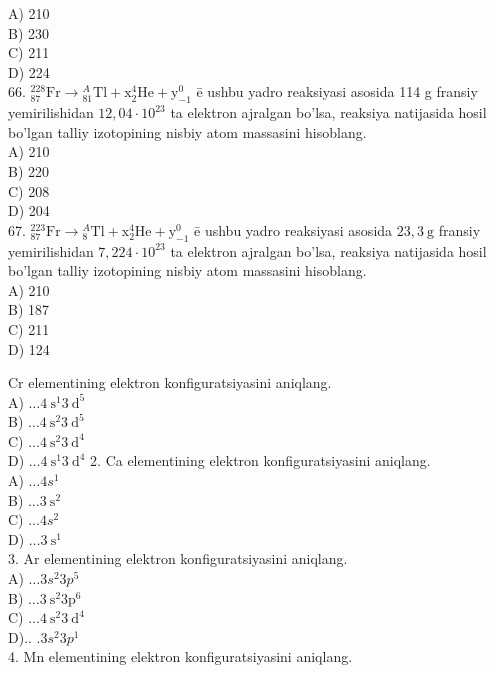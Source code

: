 A) 210\\
B) 230\\
C) 211\\
D) 224\\
66. ${ }_{87}^{228} \mathrm{Fr} \rightarrow{ }_{81}^{A} \mathrm{Tl}+\mathrm{x}_{2}^{4} \mathrm{He}+\mathrm{y}_{-1}^{0}$ ē ushbu yadro reaksiyasi asosida 114 g fransiy yemirilishidan $12,04 \cdot 10^{23}$ ta elektron ajralgan bo'lsa, reaksiya natijasida hosil bo'lgan talliy izotopining nisbiy atom massasini hisoblang.\\
A) 210\\
B) 220\\
C) 208\\
D) 204\\
67. ${ }_{87}^{223} \mathrm{Fr} \rightarrow{ }_{8}^{A} \mathrm{Tl}+\mathrm{x}_{2}^{4} \mathrm{He}+\mathrm{y}_{-1}^{0}$ ē ushbu yadro reaksiyasi asosida $23,3 \mathrm{~g}$ fransiy yemirilishidan $7,224 \cdot 10^{23}$ ta elektron ajralgan bo'lsa, reaksiya natijasida hosil bo'lgan talliy izotopining nisbiy atom massasini hisoblang.\\
A) 210\\
B) 187\\
C) 211\\
D) 124\\
  \item Cr elementining elektron konfiguratsiyasini aniqlang.\\
A) $\ldots 4 \mathrm{~s}^{1} 3 \mathrm{~d}^{5}$\\
B) $\ldots 4 \mathrm{~s}^{2} 3 \mathrm{~d}^{5}$\\
C) $\ldots 4 \mathrm{~s}^{2} 3 \mathrm{~d}^{4}$\\
D) $\ldots 4 \mathrm{~s}^{1} 3 \mathrm{~d}^{4}$
2. Ca elementining elektron konfiguratsiyasini aniqlang.\\
A) $\ldots 4 s^{1}$\\
B) $\ldots 3 \mathrm{~s}^{2}$\\
C) $\ldots 4 s^{2}$\\
D) $\ldots 3 \mathrm{~s}^{1}$\\
3. Ar elementining elektron konfiguratsiyasini aniqlang.\\
A) $\ldots 3 s^{2} 3 p^{5}$\\
B) $\ldots 3 \mathrm{~s}^{2} 3 \mathrm{p}^{6}$\\
C) $\ldots 4 \mathrm{~s}^{2} 3 \mathrm{~d}^{4}$\\
D).. $.3 s^{2} 3 p^{1}$\\
4. Mn elementining elektron konfiguratsiyasini aniqlang.\\
